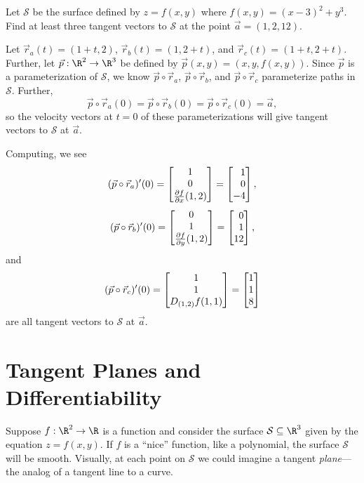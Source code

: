 \begin{example}
	Let $\mathcal S$ be the surface defined by $z=f(x,y)$ where $f(x,y)=(x-3)^2+y^3$.
	Find at least three tangent vectors to $\mathcal S$ at the point $\vec a=(1,2,12)$.

	Let $\vec r_a(t) = (1+t,2)$, $\vec r_b(t)=(1,2+t)$, and $\vec r_c(t)=
	(1+t,2+t)$.  Further, let $\vec p:\R^2\to\R^3$ be defined by $\vec p(x,y)=
	(x,y,f(x,y))$.  Since $\vec p$ is a parameterization of $\mathcal S$, we know
	$\vec p\circ \vec r_a$, $\vec p\circ \vec r_b$, 
	and $\vec p\circ \vec r_c$ parameterize paths in $\mathcal S$.  Further,
	\[\vec p\circ \vec r_a(0)=\vec p\circ \vec r_b(0)=\vec p\circ \vec r_c(0)=\vec a,\]
	so the velocity vectors at $t=0$ of these parameterizations will give 
	tangent vectors to $\mathcal S$ at $\vec a$.
	
	Computing, we see
	\[
	(\vec p\circ \vec r_a)'(0)
	= \matc{1\\0\\\frac{\partial f}{\partial x}(1,2)} = \mat{1\\0\\-4},
	\]
	\[
	(\vec p\circ \vec r_b)'(0)
	= \matc{0\\1\\\frac{\partial f}{\partial y}(1,2)} = \mat{0\\1\\12},
	\]
	and
	\[
	(\vec p\circ \vec r_c)'(0)
	= \matc{1\\1\\ D_{(1,2)}f(1,1)} = \mat{1\\1\\8}
	\]
	are all tangent vectors to $\mathcal S$ at $\vec a$.
\end{example}



\begin{exercises}
\end{exercises}

\section{Tangent Planes and Differentiability}

Suppose $f:\R^2\to\R$ is a function and consider the surface $\mathcal S\subseteq \R^3$
given by the equation $z=f(x,y)$.  If $f$ is a ``nice'' function, like a polynomial, 
the surface $\mathcal S$ will be smooth.  Visually, at each point on $\mathcal S$ we
could imagine a tangent \emph{plane}---the analog of a tangent line to a curve.


